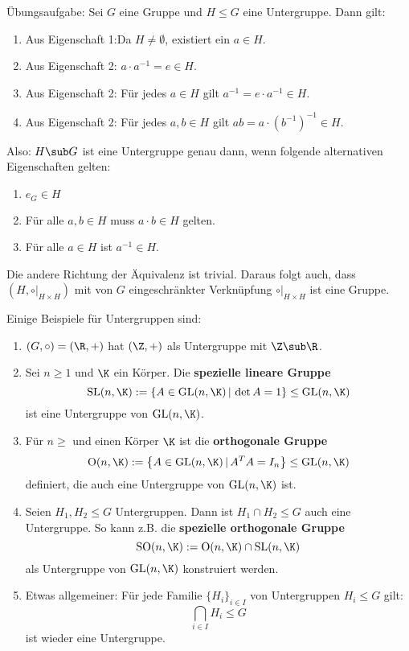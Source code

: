 \begin{bemerkung} Übungsaufgabe:
Sei $G$ eine Gruppe und $H \leq G$ eine Untergruppe. Dann gilt:
\begin{enumerate}
\item Aus Eigenschaft 1:Da $H \neq \emptyset$, existiert ein $a \in H$.
\item Aus Eigenschaft 2: $a \cdot a^{-1} = e \in H$.
\item Aus Eigenschaft 2: Für jedes $a \in H$ gilt $a^{-1} = e \cdot a^{-1} \in H$.
\item Aus Eigenschaft 2: Für jedes $a,b \in H$ gilt $ab = a \cdot (b^{-1})^{-1} \in H$.
\end{enumerate}
Also: $H \sub G$ ist eine Untergruppe genau dann, wenn folgende alternativen Eigenschaften gelten:
\begin{enumerate}
\item $e_G \in H$
\item Für alle $a,b \in H$ muss $a \cdot b \in H$ gelten.
\item Für alle $a \in H$ ist $a^{-1} \in H$.
\end{enumerate}
Die andere Richtung der Äquivalenz ist trivial. Daraus folgt auch, dass $(H, \circ|_{H \times H})$ mit von $G$ eingeschränkter Verknüpfung $\circ|_{H \times H}$ ist eine Gruppe. 
\end{bemerkung}
\begin{beispiele}
Einige Beispiele für Untergruppen sind:
\begin{enumerate}
\item $(G, \circ) = (\R, +)$ hat $(\Z, +)$ als Untergruppe mit $\Z \sub \R$.
\item Sei $n \geq 1$ und $\K$ ein Körper. Die \textbf{spezielle lineare Gruppe}
\begin{equation}
\text{SL} (n, \K) := \left\{ A \in \text{GL}(n, \K) \, | \, \det A = 1\right\} \leq \text{GL}(n, \K)
\end{equation}
ist eine Untergruppe von $\text{GL}(n,\K)$.
\item Für $n \geq$ und einen Körper $\K$ ist die \textbf{orthogonale Gruppe}
\begin{equation}
\text{O}(n, \K) := \left\{ A \in \text{GL}(n, \K) \, | \, A^TA = I_n \right\} \leq \text{GL}(n, \K)
\end{equation}
definiert, die auch eine Untergruppe von $\text{GL}(n, \K)$ ist.
\item Seien $H_1, H_2 \leq G$ Untergruppen. Dann ist $H_1 \cap H_2 \leq G$ auch eine Untergruppe. So kann z.B. die \textbf{spezielle orthogonale Gruppe}
\begin{equation}
\text{SO}(n, \K) := \text{O}(n, \K) \cap \text{SL}(n, \K)
\end{equation}
als Untergruppe von $\text{GL}(n, \K)$ konstruiert werden.
\item Etwas allgemeiner: Für jede Familie $\{H_i\}_{i\in I}$ von Untergruppen $H_i \leq G$ gilt:
\begin{equation}
\bigcap_{i \in I} H_i \leq G
\end{equation}
ist wieder eine Untergruppe.
\end{enumerate}
\end{beispiele}
